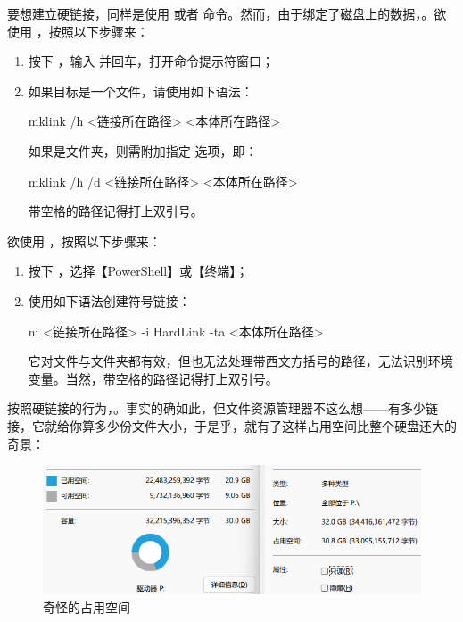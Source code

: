 {{{要想建立硬链接，同样是使用  或者  命令。然而，由于绑定了磁盘上的数据，。欲使用 ，按照以下步骤来：

\begin{enumerate}
  \item 按下 ，输入  并回车，打开命令提示符窗口；
  \item 如果目标是一个文件，请使用如下语法：
    \begin{MissingVerbatim}[bat]
      mklink /h <链接所在路径> <本体所在路径>
    \end{MissingVerbatim}
    如果是文件夹，则需附加指定  选项，即：
    \begin{MissingVerbatim}[bat]
      mklink /h /d <链接所在路径> <本体所在路径>
    \end{MissingVerbatim}
    带空格的路径记得打上双引号。
\end{enumerate}

欲使用 ，按照以下步骤来：

\begin{enumerate}
  \item 按下 ，选择【PowerShell】或【终端】；
  \item 使用如下语法创建符号链接：
    \begin{MissingVerbatim}[pwsh]
      ni <链接所在路径> -i HardLink -ta <本体所在路径>
    \end{MissingVerbatim}
    它对文件与文件夹都有效，但也无法处理带西文方括号的路径，无法识别环境变量。当然，带空格的路径记得打上双引号。
\end{enumerate}

按照硬链接的行为，。事实的确如此，但文件资源管理器不这么想——有多少链接，它就给你算多少份文件大小，于是乎，就有了这样占用空间比整个硬盘还大的奇景：

\begin{figure}[htb!]
  \centering
  \includegraphics[width=.8\textwidth]{assets/advanced/Interesting_Storage_Size.png}
  \caption{奇怪的占用空间}
  \label{fig:Interesting_Storage_Size}
\end{figure}

}}}
